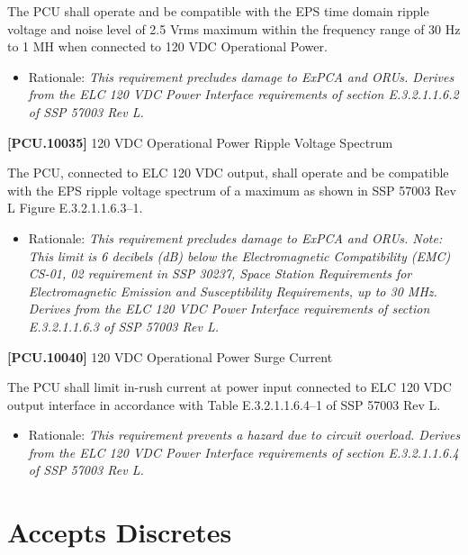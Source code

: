 The \gls{PCU} shall operate and be compatible with the EPS time domain ripple voltage and noise level of 2.5 Vrms maximum within the frequency range of 30 Hz to 1 MH when connected to 120 \gls{VDC} Operational Power.

\begin{itemize}
\item{} Rationale: \emph{This requirement precludes damage to ExPCA and ORUs. Derives from the ELC 120 VDC Power Interface requirements of section E.3.2.1.1.6.2 of SSP 57003 Rev L.}

\end{itemize}

\textbf{[PCU.10035]} 120 \gls{VDC} Operational Power Ripple Voltage Spectrum

The \gls{PCU}, connected to \gls{ELC} 120 \gls{VDC} output, shall operate and be compatible with the EPS ripple voltage spectrum of a maximum as shown in SSP 57003 Rev L Figure E.3.2.1.1.6.3--1.

\begin{itemize}
\item{} Rationale: \emph{This requirement precludes damage to ExPCA and ORUs. Note: This limit is 6 decibels (dB) below the Electromagnetic Compatibility (EMC) CS-01, 02 requirement in SSP 30237, Space Station Requirements for Electromagnetic Emission and Susceptibility Requirements, up to 30 MHz. Derives from the ELC 120 VDC Power Interface requirements of section E.3.2.1.1.6.3 of SSP 57003 Rev L.}

\end{itemize}

\textbf{[PCU.10040]} 120 \gls{VDC} Operational Power Surge Current

The \gls{PCU} shall limit in-rush current at power input connected to \gls{ELC} 120 \gls{VDC} output interface in accordance with Table E.3.2.1.1.6.4--1 of SSP 57003 Rev L.

\begin{itemize}
\item{} Rationale: \emph{This requirement prevents a hazard due to circuit overload. Derives from the ELC 120 VDC Power Interface requirements of section E.3.2.1.1.6.4 of SSP 57003 Rev L.}

\end{itemize}

\section{Accepts Discretes}
\label{acceptsdiscretes}

